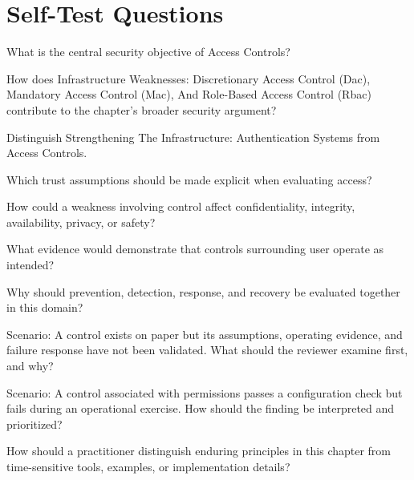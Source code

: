 \documentclass[11pt,letterpaper]{article}
\begin{document}
\section*{Self-Test Questions}
\begin{CornellRecallList}
\item What is the central security objective of Access Controls?
\item How does Infrastructure Weaknesses: Discretionary Access Control (Dac), Mandatory Access Control (Mac), And Role-Based Access Control (Rbac) contribute to the chapter's broader security argument?
\item Distinguish Strengthening The Infrastructure: Authentication Systems from Access Controls.
\item Which trust assumptions should be made explicit when evaluating access?
\item How could a weakness involving control affect confidentiality, integrity, availability, privacy, or safety?
\item What evidence would demonstrate that controls surrounding user operate as intended?
\item Why should prevention, detection, response, and recovery be evaluated together in this domain?
\item Scenario: A control exists on paper but its assumptions, operating evidence, and failure response have not been validated. What should the reviewer examine first, and why?
\item Scenario: A control associated with permissions passes a configuration check but fails during an operational exercise. How should the finding be interpreted and prioritized?
\item How should a practitioner distinguish enduring principles in this chapter from time-sensitive tools, examples, or implementation details?
\end{CornellRecallList}
\end{document}
